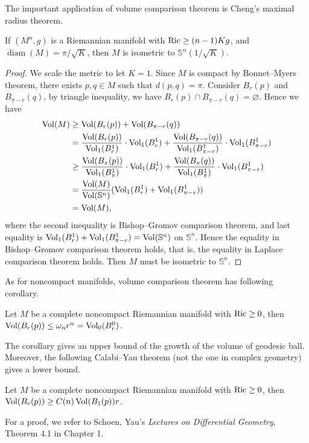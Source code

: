 The important application of volume comparison theorem is Cheng's maximal radius theorem.
\begin{thm}[Cheng]
    If $(M^n,g)$ is a Riemannian manifold with $\operatorname{Ric}\geq(n-1)Kg$, and $\operatorname{diam}(M)=\pi/\sqrt{K}$, then $M$ is isometric to $\mathbb{S}^n(1/\sqrt{K})$.
\end{thm}
\begin{proof}
    We scale the metric to let $K=1$.
    Since $M$ is compact by Bonnet--Myers theorem, there exists $p,q\in M$ such that $d(p,q)=\pi$.
    Consider $B_r(p)$ and $B_{\pi-r}(q)$, by triangle inequality, we have $B_r(p)\cap B_{\pi-r}(q)=\varnothing$.
    Hence we have
    \begin{align*}
        \operatorname{Vol}(M)&\geq\operatorname{Vol}(B_r(p))+\operatorname{Vol}(B_{\pi-r}(q))\\
        &=\frac{\operatorname{Vol}(B_r(p))}{\operatorname{Vol}_1(B_r^1)}\cdot\operatorname{Vol}_1(B_r^1)+\frac{\operatorname{Vol}(B_{\pi-r}(q))}{\operatorname{Vol}_1(B_{\pi-r}^1)}\cdot\operatorname{Vol}_1(B_{\pi-r}^1)\\
        &\geq\frac{\operatorname{Vol}(B_\pi(p))}{\operatorname{Vol}_1(B_\pi^1)}\cdot\operatorname{Vol}_1(B_r^1)+\frac{\operatorname{Vol}(B_\pi(q))}{\operatorname{Vol}_1(B_\pi^1)}\cdot\operatorname{Vol}_1(B_{\pi-r}^1)\\
        &=\frac{\operatorname{Vol}(M)}{\operatorname{Vol}(\mathbb{S}^n)}(\operatorname{Vol}_1(B_r^1)+\operatorname{Vol}_1(B_{\pi-r}^1))\\
        &=\operatorname{Vol}(M),
    \end{align*}
    where the second inequality is Bishop--Gromov comparison theorem, and last equality is $\operatorname{Vol}_1(B_r^1)+\operatorname{Vol}_1(B_{\pi-r}^1)=\operatorname{Vol}(\mathbb{S}^n)$ on $\mathbb{S}^n$.
    Hence the equality in Bishop--Gromov comparison theorem holds, that is, the equality in Laplace comparison theorem holds.
    Then $M$ must be isometric to $\mathbb{S}^n$.
\end{proof}

As for noncompact manifolds, volume comparison theorem has following corollary.

\begin{cor}
    Let $M$ be a complete noncompact Riemannian manifold with $\operatorname{Ric}\geq 0$, then $\operatorname{Vol}(B_r(p))\leq\omega_nr^n=\operatorname{Vol}_0(B_r^0)$.
\end{cor}

The corollary gives an upper bound of the growth of the volume of geodesic ball.
Moreover, the following Calabi--Yau theorem (not the one in complex geometry) gives a lower bound.
\begin{thm}
    Let $M$ be a complete noncompact Riemannian manifold with $\operatorname{Ric}\geq 0$, then $\operatorname{Vol}(B_r(p))\geq C(n)\operatorname{Vol}(B_1(p))r$.
\end{thm}
For a proof, we refer to Schoen, Yau's \emph{Lectures on Differential Geometry}, Theorem 4.1 in Chapter 1.